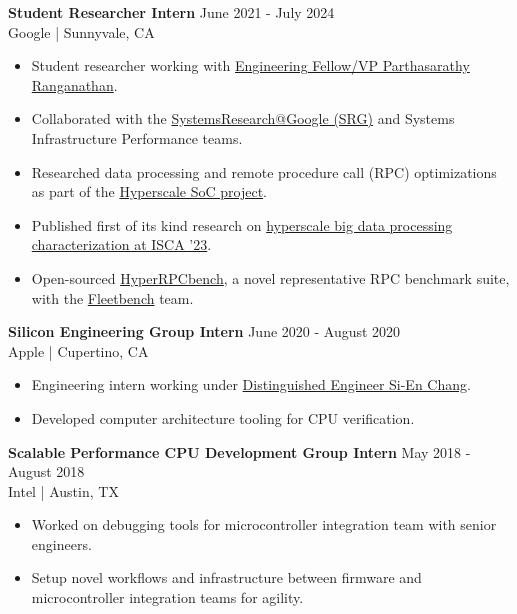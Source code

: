 \documentclass[line]{res}
\begin{document}
\begin{resume}
\textbf{Student Researcher Intern} \hfill June 2021 - July 2024
\\
Google | Sunnyvale, CA
\\
\vspace{-3mm}
\begin{itemize}
\item Student researcher working with \href{https://www.parthasarathys.com/}{Engineering Fellow/VP Parthasarathy Ranganathan}.
\item Collaborated with the \href{https://techsysinfra.google/research/}{SystemsResearch@Google (SRG)} and Systems Infrastructure Performance teams.
\item Researched data processing and remote procedure call (RPC) optimizations as part of the \hyperref[sec:hyperscale-soc]{Hyperscale SoC project}.
\item Published first of its kind research on \href{https://dl.acm.org/doi/10.1145/3579371.3589082}{hyperscale big data processing characterization at ISCA '23}.
\item Open-sourced \href{https://github.com/google/fleetbench/tree/cd20746b68b307b148a761c676d6400f2541082d/fleetbench/rpc}{HyperRPCbench}, a novel representative RPC benchmark suite, with the \href{https://github.com/google/fleetbench}{Fleetbench} team.
\end{itemize}

\vspace{-3mm}

\textbf{Silicon Engineering Group Intern} \hfill June 2020 - August 2020
\\
Apple | Cupertino, CA
\\
\vspace{-3mm}
\begin{itemize}
\item Engineering intern working under \href{https://www.linkedin.com/in/sienchang/}{Distinguished Engineer Si-En Chang}.
\item Developed computer architecture tooling for CPU verification.
\end{itemize}

\vspace{-3mm}

\textbf{Scalable Performance CPU Development Group Intern} \hfill May 2018 - August 2018
\\
Intel | Austin, TX
\\
\vspace{-3mm}
\begin{itemize}
\item Worked on debugging tools for microcontroller integration team with senior engineers.
\item Setup novel workflows and infrastructure between firmware and microcontroller integration teams for agility.
\end{itemize}


\end{resume}
\end{document}
